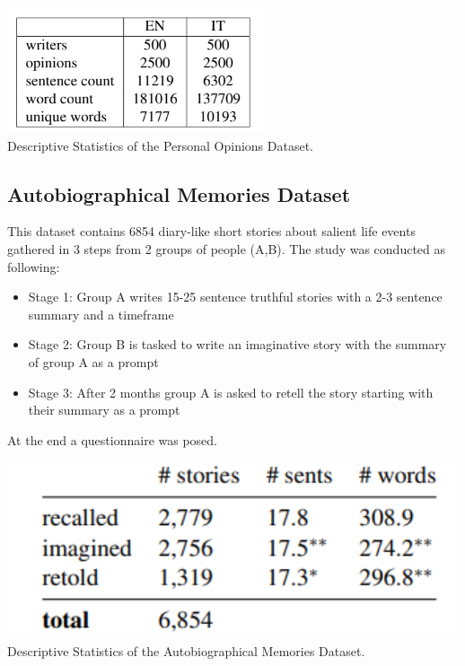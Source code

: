 \documentclass[10pt,twocolumn,letterpaper]{article}
\begin{document}
\begin{center}
\includegraphics[scale=1]{img/dec_op_dataset_statistics.png} \\
\small {Descriptive Statistics of the Personal Opinions Dataset.} 
\end{center}

\subsection{Autobiographical Memories Dataset}

This dataset contains 6854 diary-like short stories about salient life events gathered in 3 steps from 2 groups of people (A,B).
The study was conducted as following:

\begin{itemize}
    \item Stage 1: Group A writes 15-25 sentence truthful stories with a 2-3 sentence summary and a timeframe
    \item Stage 2: Group B is tasked to write an imaginative story with the summary of group A as a prompt
    \item Stage 3: After 2 months group A is asked to retell the story starting with their summary as a prompt
\end{itemize}
At the end a questionnaire was posed. \\

\begin{center}
\includegraphics[scale=0.35]{img/autobio_mem_dataset.jpg} \\
\small {Descriptive Statistics of the Autobiographical Memories Dataset.}
\end{center}
\end{document}
